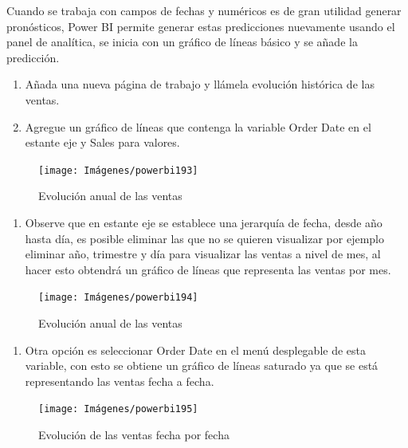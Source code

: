 \documentclass[
]{book}
\providecommand{\tightlist}{%
  \setlength{\itemsep}{0pt}\setlength{\parskip}{0pt}}
\begin{document}
Cuando se trabaja con campos de fechas y numéricos es de gran utilidad generar pronósticos, Power BI permite generar estas predicciones nuevamente usando el panel de analítica, se inicia con un gráfico de líneas básico y se añade la predicción.

\begin{enumerate}
\def\labelenumi{\arabic{enumi}.}
\item
  Añada una nueva página de trabajo y llámela evolución histórica de las ventas.
\item
  Agregue un gráfico de líneas que contenga la variable Order Date en el estante eje y Sales para valores.
\end{enumerate}

\begin{figure}

{\centering \texttt{[image: Imágenes/powerbi193]} 

}

\caption{Evolución anual de las ventas}\label{fig:paso2pronosticopowerbi-fig}
\end{figure}

\begin{enumerate}
\def\labelenumi{\arabic{enumi}.}
\setcounter{enumi}{2}
\tightlist
\item
  Observe que en estante eje se establece una jerarquía de fecha, desde año hasta día, es posible eliminar las que no se quieren visualizar por ejemplo eliminar año, trimestre y día para visualizar las ventas a nivel de mes, al hacer esto obtendrá un gráfico de líneas que representa las ventas por mes.
\end{enumerate}

\begin{figure}

{\centering \texttt{[image: Imágenes/powerbi194]} 

}

\caption{Evolución anual de las ventas}\label{fig:paso3pronosticopowerbi-fig}
\end{figure}

\begin{enumerate}
\def\labelenumi{\arabic{enumi}.}
\setcounter{enumi}{3}
\tightlist
\item
  Otra opción es seleccionar Order Date en el menú desplegable de esta variable, con esto se obtiene un gráfico de líneas saturado ya que se está representando las ventas fecha a fecha.
\end{enumerate}

\begin{figure}

{\centering \texttt{[image: Imágenes/powerbi195]} 

}

\caption{Evolución de las ventas fecha por fecha}\label{fig:paso4pronosticopowerbi-fig}
\end{figure}
\end{document}
